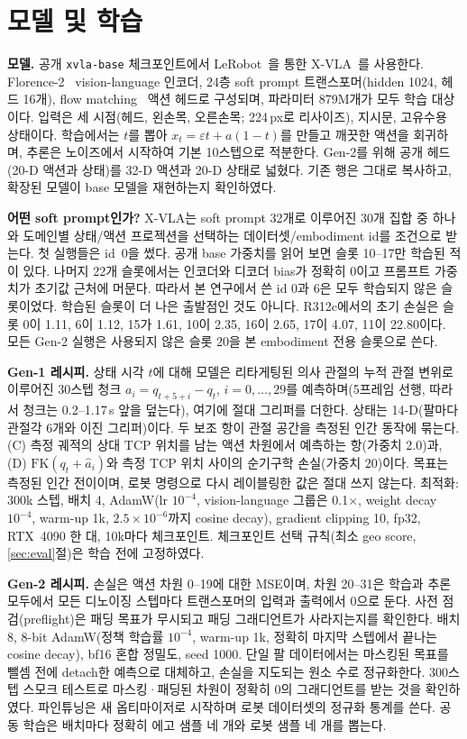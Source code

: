 \documentclass[conference,10pt]{IEEEtran}
\begin{document}
\section{모델 및 학습}\label{sec:model}
\textbf{모델.} 공개 \texttt{xvla-base} 체크포인트에서 LeRobot~\cite{cadene2024lerobot}을 통한 X-VLA~\cite{zheng2025xvla}를 사용한다.
Florence-2~\cite{xiao2024florence2} vision-language 인코더, 24층 soft prompt 트랜스포머(hidden 1024, 헤드 16개),
flow matching~\cite{lipman2023flow} 액션 헤드로 구성되며, 파라미터 879M개가 모두 학습 대상이다. 입력은 세 시점(헤드, 왼손목,
오른손목; 224\,px로 리사이즈), 지시문, 고유수용 상태이다. 학습에서는 $t$를 뽑아 $x_t=\varepsilon t+a(1-t)$를 만들고 깨끗한 액션을
회귀하며, 추론은 노이즈에서 시작하여 기본 10스텝으로 적분한다. Gen-2를 위해 공개 헤드(20-D 액션과 상태)를 32-D 액션과 20-D 상태로
넓혔다. 기존 행은 그대로 복사하고, 확장된 모델이 base 모델을 재현하는지 확인하였다.

\textbf{어떤 soft prompt인가?} X-VLA는 soft prompt 32개로 이루어진 30개 집합 중 하나와 도메인별 상태/액션 프로젝션을 선택하는
데이터셋/embodiment id를 조건으로 받는다. 첫 실행들은 id~0을 썼다. 공개 base 가중치를 읽어 보면 슬롯 10--17만 학습된 적이 있다.
나머지 22개 슬롯에서는 인코더와 디코더 bias가 정확히 0이고 프롬프트 가중치가 초기값 근처에 머문다. 따라서 본 연구에서 쓴 id 0과 6은
모두 학습되지 않은 슬롯이었다. 학습된 슬롯이 더 나은 출발점인 것도 아니다. R312c에서의 초기 손실은 슬롯 0이 1.11, 6이 1.12, 15가
1.61, 10이 2.35, 16이 2.65, 17이 4.07, 11이 22.80이다. 모든 Gen-2 실행은 사용되지 않은 슬롯 20을 본 embodiment 전용 슬롯으로 쓴다.

\textbf{Gen-1 레시피.} 상태 시각 $t$에 대해 모델은 리타게팅된 의사 관절의 누적 관절 변위로 이루어진 30스텝 청크
$a_i = q_{t+5+i}-q_t$, $i=0,\dots,29$를 예측하며(5프레임 선행, 따라서 청크는 0.2--1.17\,s 앞을 덮는다), 여기에 절대 그리퍼를 더한다.
상태는 14-D(팔마다 관절각 6개와 이진 그리퍼)이다. 두 보조 항이 관절 공간을 측정된 인간 동작에 묶는다. (C) 측정 궤적의 상대 TCP
위치를 남는 액션 차원에서 예측하는 항(가중치 2.0)과, (D) $\mathrm{FK}(q_t+\hat a_i)$와 측정 TCP 위치 사이의 순기구학 손실(가중치
20)이다. 목표는 측정된 인간 전이이며, 로봇 명령으로 다시 레이블링한 값은 절대 쓰지 않는다. 최적화: 300k 스텝, 배치 4, AdamW(lr
$10^{-4}$, vision-language 그룹은 0.1$\times$, weight decay $10^{-4}$, warm-up 1k, $2.5\times10^{-6}$까지 cosine decay), gradient
clipping 10, fp32, RTX~4090 한 대, 10k마다 체크포인트. 체크포인트 선택 규칙(최소 geo score, \ref{sec:eval}절)은 학습 전에 고정하였다.

\textbf{Gen-2 레시피.} 손실은 액션 차원 0--19에 대한 MSE이며, 차원 20--31은 학습과 추론 모두에서 모든 디노이징 스텝마다
트랜스포머의 입력과 출력에서 0으로 둔다. 사전 점검(preflight)은 패딩 목표가 무시되고 패딩 그래디언트가 사라지는지를 확인한다. 배치 8,
8-bit AdamW(정책 학습률 $10^{-4}$, warm-up 1k, 정확히 마지막 스텝에서 끝나는 cosine decay), bf16 혼합 정밀도, seed 1000. 단일 팔
데이터에서는 마스킹된 목표를 뺄셈 전에 detach한 예측으로 대체하고, 손실을 지도되는 원소 수로 정규화한다. 300스텝 스모크 테스트로
마스킹·패딩된 차원이 정확히 0의 그래디언트를 받는 것을 확인하였다. 파인튜닝은 새 옵티마이저로 시작하며 로봇 데이터셋의 정규화 통계를
쓴다. 공동 학습은 배치마다 정확히 에고 샘플 네 개와 로봇 샘플 네 개를 뽑는다.
\end{document}
